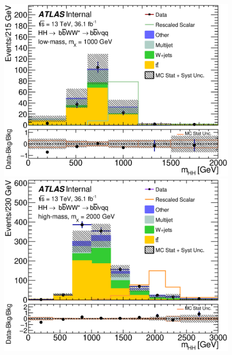 \documentclass{beamer}
\begin{document}
\begin{frame}
\begin{columns}
\begin{column}{0.5\textwidth}
\begin{center}
\includegraphics[width=0.9\textwidth]{figures/C_reOpt700_mww_bbpt210_wwpt250_mbb_hhMass_regionA_met25d020}\\
\includegraphics[width=0.9\textwidth]{figures/C_reOpt2000_bbpt350_wwpt250_drww15_mbb_hhMass_regionA_met25d020}
\end{center}
\end{column}
\end{columns}
\end{frame}
\end{document}
